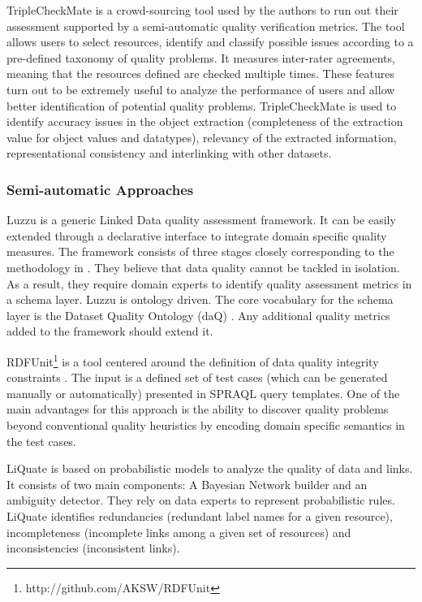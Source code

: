 \documentclass[onecolumn, crcready]{iosart2c}
\begin{document}
TripleCheckMate \cite{Kontokostas2013} is a crowd-sourcing tool used by the authors to run out their assessment supported by a semi-automatic quality verification metrics. The tool allows users to select resources, identify and classify possible issues according to a pre-defined taxonomy of quality problems. It measures inter-rater agreements, meaning that the resources defined are checked multiple times. These features turn out to be extremely useful to analyze the performance of users and allow better identification of potential quality problems. TripleCheckMate is used to identify accuracy issues in the object extraction (completeness of the extraction value for object values and datatypes), relevancy of the extracted information, representational consistency and interlinking with other datasets.

\subsubsection{Semi-automatic Approaches}

Luzzu \cite{DBLP:journals/corr/DebattistaLLA14} is a generic Linked Data quality assessment framework. It can be easily extended through a declarative interface to integrate domain specific quality measures. The framework consists of three stages closely corresponding to the methodology in \cite{DBLP:conf/i-semantics/RulaZ14}. They believe that data quality cannot be tackled in isolation. As a result, they require domain experts to identify quality assessment metrics in a schema layer. Luzzu is ontology driven. The core vocabulary for the schema layer is the Dataset Quality Ontology (daQ) \cite{DBLP:conf/www/Debattista0A14}. Any additional quality metrics added to the framework should extend it.

RDFUnit\footnote{http://github.com/AKSW/RDFUnit} is a tool centered around the definition of data quality integrity constraints \cite{Kontokostas:2014:TEL:2566486.2568002}. The input is a defined set of test cases (which can be generated manually or automatically) presented in SPRAQL query templates. One of the main advantages for this approach is the ability to discover quality problems beyond conventional quality heuristics by encoding domain specific semantics in the test cases.

LiQuate \cite{conf/otm/RuckhausBV13} is based on probabilistic models to analyze the quality of data and links. It consists of two main components: A Bayesian Network builder and an ambiguity detector. They rely on data experts to represent probabilistic rules. LiQuate identifies redundancies (redundant label names for a given resource), incompleteness (incomplete links among a given set of resources) and inconsistencies (inconsistent links).
\end{document}
